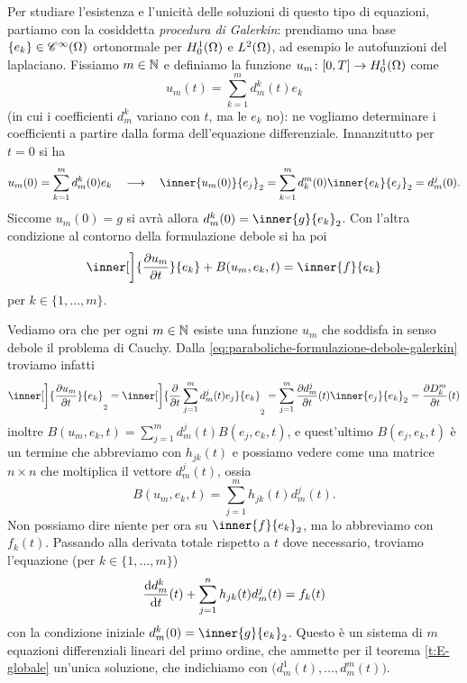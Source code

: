 Per studiare l'esistenza e l'unicità delle soluzioni di questo tipo di equazioni, partiamo con la cosiddetta \emph{procedura di Galerkin}: prendiamo una base $\{e_k\}\in\cont[\infty]{\Omega}$ ortonormale per $\sobHc[1]{\Omega}$ e $\leb[2]{\Omega}$, ad esempio le autofunzioni del laplaciano.
Fissiamo $m\in\N$ e definiamo la funzione $u_m\colon[0,T]\to\sobHc[1]{\Omega}$ come
\begin{equation}
    u_m(t)=\sum_{k=1}^md^k_m(t)e_k
\end{equation}
(in cui i coefficienti $d^k_m$ variano con $t$, ma le $e_k$ no): ne vogliamo determinare i coefficienti a partire dalla forma dell'equazione differenziale.
Innanzitutto per $t=0$ si ha
\begin{equation}
    u_m(0)=\sum_{k=1}^md^k_m(0)e_k
    \qqq
    \inner{u_m(0)}{e_j}_2=\sum_{k=1}^md^m_k(0)\inner{e_k}{e_j}_2=d^j_m(0).
\end{equation}
Siccome $u_m(0)=g$ si avrà allora $d^k_m(0)=\inner{g}{e_k}_2$.
Con l'altra condizione al contorno della formulazione debole si ha poi
\begin{equation}
    \inner[\bigg]{\drp{u_m}{t}}{e_k}+B(u_m,e_k,t)=\inner{f}{e_k}
    \label{eq:paraboliche-formulazione-debole-galerkin}
\end{equation}
per $k\in\{1,\dotsc,m\}$.

Vediamo ora che per ogni $m\in\N$ esiste una funzione $u_m$ che soddisfa in senso debole il problema di Cauchy.
Dalla \eqref{eq:paraboliche-formulazione-debole-galerkin} troviamo infatti
\begin{equation}
    \inner[\bigg]{\drp{u_m}{t}}{e_k}_2=
    \inner[\bigg]{\drp{}{t}\sum_{j=1}^md^j_m(t)e_j}{e_k}_2=
    \sum_{j=1}^m\drp{d^j_m}{t}(t)\inner{e_j}{e_k}_2=
    \drp{D_k^m}{t}(t)
\end{equation}
inoltre $B(u_m,e_k,t)=\sum_{j=1}^md^j_m(t)B(e_j,e_k,t)$, e quest'ultimo $B(e_j,e_k,t)$ è un termine che abbreviamo con $h_{jk}(t)$ e possiamo vedere come una matrice $n\times n$ che moltiplica il vettore $d^j_m(t)$, ossia
\begin{equation}
    B(u_m,e_k,t)=\sum_{j=1}^mh_{jk}(t)d^j_m(t).
\end{equation}
Non possiamo dire niente per ora su $\inner{f}{e_k}_2$, ma lo abbreviamo con $f_k(t)$.
Passando alla derivata totale rispetto a $t$ dove necessario, troviamo l'equazione (per $k\in\{1,\dotsc,m\}$)
\begin{equation}
    \drv{d^k_m}{t}(t)+\sum_{j=1}^nh_{jk}(t)d^j_m(t)=f_k(t)
\end{equation}
con la condizione iniziale $d^k_m(0)=\inner{g}{e_k}_2$.
Questo è un sistema di $m$ equazioni differenziali lineari del primo ordine, che ammette per il teorema \ref{t:E-globale} un'unica soluzione, che indichiamo con $\bigl(d^1_m(t),\dotsc,d^m_m(t)\bigr)$.


